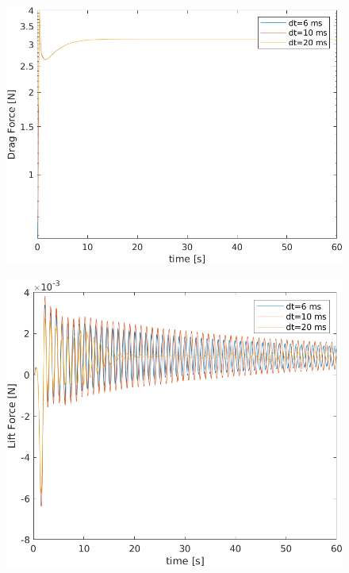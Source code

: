 \documentclass[12pt]{article}
\begin{document}
        \begin{figure}[!ht]
                \includegraphics[width=\textwidth]{DragForce.png}
                \centering
                \caption{}
                \label{fig:drag}
        \end{figure}

        \begin{figure}[!ht]
                \includegraphics[width=\textwidth]{LiftForce.png}
                \centering
                \caption{}
                \label{fig:lift}
        \end{figure}
\end{document}
